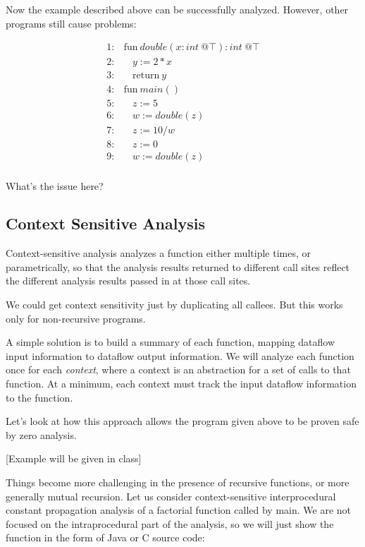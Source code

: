 \documentclass[11pt]{article}
\begin{document}

Now the example described above can be successfully analyzed.  However, other programs still cause problems:

\[
\begin{array}{ll}
1: & \mbox{fun}~ \textit{double}(x:int ~@\top):int ~@\top\\
2: & ~~~~y := 2 * x\\
3: & ~~~~\mbox{return}~ y\\[1ex]

4: & \mbox{fun}~ \textit{main}()\\
5: & ~~~~z := 5\\
6: & ~~~~w := \textit{double}(z)\\
7: & ~~~~z := 10/w\\
8: & ~~~~z := 0\\
9: & ~~~~w := \textit{double}(z)\\[1ex]
\end{array}
\]

\noindent What's the issue here?


\subsection{Context Sensitive Analysis}

Context-sensitive analysis analyzes a function either multiple times, or parametrically, so that the analysis results returned to different call sites reflect the different analysis results passed in at those call sites.

We could get context sensitivity just by duplicating all callees.  But this works only for non-recursive programs.

A simple solution is to build a summary of each function, mapping dataflow input information to dataflow output information.  We will analyze each function once for each \textit{context}, where a context is an abstraction for a set of calls to that function.  At a minimum, each context must track the input dataflow information to the function.

Let's look at how this approach allows the program given above to be proven safe by zero analysis.

[Example will be given in class]

Things become more challenging in the presence of recursive functions, or more generally mutual recursion.  Let us consider context-sensitive interprocedural constant propagation analysis of a factorial function called by main.  We are not focused on the intraprocedural part of the analysis, so we will just show the function in the form of Java or C source code:
\end{document}
